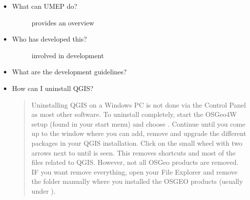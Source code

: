 \documentclass[letterpaper,10pt,english]{sphinxmanual}
\begin{document}
\begin{itemize}
\begin{description}
\end{description}

\item {} \begin{description}
\item[{What can UMEP do?}] \leavevmode
{\hyperref[\detokenize{Introduction:pluginarchitecture}]{}} provides an overview

\end{description}

\item {} \begin{description}
\item[{Who has developed this?}] \leavevmode
{\hyperref[\detokenize{People_Involved___Acknowledgements::doc}]{}} involved in development

\end{description}

\item {} \begin{description}
\item[{What are the development guidelines?}] \leavevmode
{}

\end{description}

\item {} 
How can I uninstall QGIS?
\begin{quote}

Uninstalling QGIS on a Windows PC is not done via the Control Panel as most other software. To uninstall completely, start the OSGeo4W setup (found in your start menu) and choose . Continue until you come up to the window where you can add, remove and upgrade the different packages in your QGIS installation. Click on the small wheel with two arrows next to  until  is seen. This removes shortcuts and most of the files related to QGIS. However, not all OSGeo products are removed. IF you want remove everything, open your File Explorer and remove the folder manually where you installed the OSGEO products (usually under ).
\begin{quote}

\begin{figure}[htbp]
\centering
\capstart


\end{figure}
\end{quote}
\end{quote}
\end{itemize}
\end{document}
